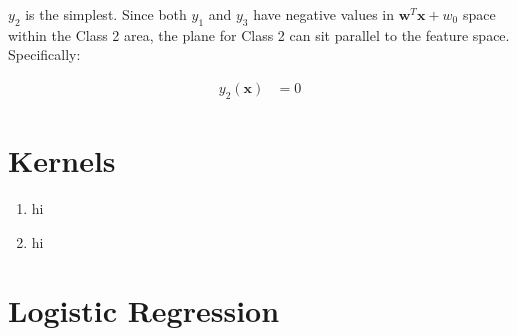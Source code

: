 \documentclass{article}
\begin{document}
$y_2$ is the simplest. Since both $y_1$ and $y_3$ have negative values
in $\mathbf{w}^T\mathbf{x} + w_0$ space within the Class 2 area,
the plane for Class 2 can sit parallel to the feature space. Specifically:

\begin{align*}
  y_2(\mathbf{x}) &= 0
\end{align*}

\section{Kernels}

\begin{enumerate}
\item hi
\item hi
\end{enumerate}

\section{Logistic Regression}
\end{document}
